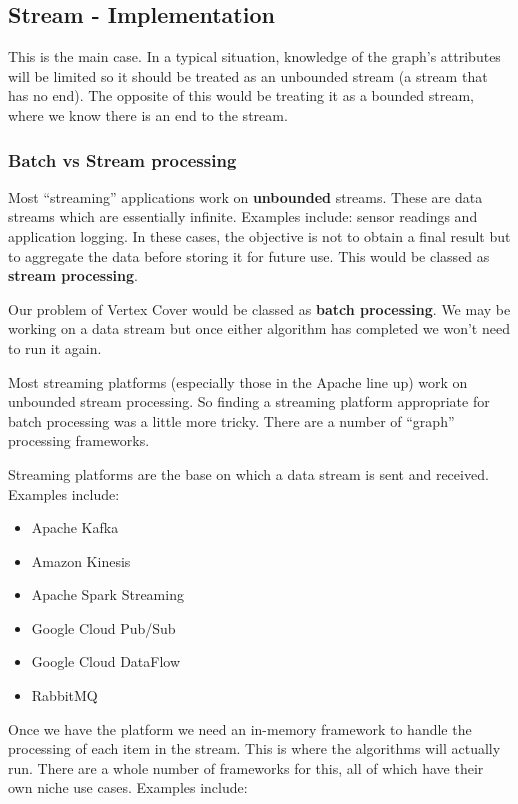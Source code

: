 \subsection{Stream - Implementation}

This is the main case. In a typical situation, knowledge of the graph's
attributes will be limited so it should be treated as an unbounded stream (a
stream that has no end). The opposite of this would be treating it as a bounded
stream, where we know there is an end to the stream.

\subsubsection{Batch vs Stream processing}

Most ``streaming'' applications work on \textbf{unbounded} streams. These are
data streams which are essentially infinite. Examples include: sensor readings
and application logging. In these cases, the objective is not to obtain a final
result but to aggregate the data before storing it for future use. This would
be classed as \textbf{stream processing}.

Our problem of Vertex Cover would be classed as \textbf{batch processing}. We
may be working on a data stream but once either algorithm has completed we
won't need to run it again.

Most streaming platforms (especially those in the Apache line up) work on
unbounded stream processing. So finding a streaming platform appropriate for
batch processing was a little more tricky. There are a number of ``graph''
processing frameworks.

Streaming platforms are the base on which a data stream is sent and received.
Examples include:

\begin{itemize}
    \item
          Apache Kafka
    \item
          Amazon Kinesis
    \item
          Apache Spark Streaming
    \item
          Google Cloud Pub/Sub
    \item
          Google Cloud DataFlow
    \item
          RabbitMQ
\end{itemize}

Once we have the platform we need an in-memory framework to handle the
processing of each item in the stream. This is where the algorithms will
actually run. There are a whole number of frameworks for this, all of which
have their own niche use cases. Examples include:

